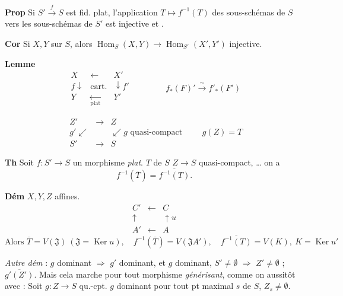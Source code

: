 \documentclass[11pt,a4paper]{article}
\begin{document}
\textbf{Prop} Si $S' \xrightarrow{f} S$ est fid. plat, l'application $T \mapsto f^{-1}(T)$ des sous-schémas de $S$ vers les sous-schémas de $S'$ est injective et \ill{}.

\textbf{Cor} Si $X, Y$ sur $S$, alors $\operatorname{Hom}_S(X, Y) \to \operatorname{Hom}_{S'}(X', Y')$ injective.

\textbf{Lemme}
\[
\begin{array}{ccc}
X & \longleftarrow & X' \\
{\scriptstyle f}\downarrow & \text{cart.} & \downarrow{\scriptstyle f'} \\
Y & \xleftarrow[\text{plat}]{} & Y'
\end{array}
\qquad\qquad f_*(F)' \xrightarrow{\ \sim\ } f'_*(F')
\]

\[
\begin{array}{ccc}
Z' & \longrightarrow & Z \\
{\scriptstyle g'}\swarrow & & \swarrow{\scriptstyle g} \text{ quasi-compact} \\
S' & \longrightarrow & S
\end{array}
\qquad g(Z) = T
\]

\textbf{Th} Soit $f : S' \to S$ un morphisme \emph{plat}.  \ill{}  $T$ de $S$   $Z \to S$ quasi-compact, … on a
\[
f^{-1}(\overline{T}) = \overline{f^{-1}(T)} .
\]

\textbf{Dém}  $X, Y, Z$ affines.
\[
\begin{array}{ccc} C' & \longleftarrow & C \\ \uparrow & & \uparrow{\scriptstyle u} \\ A' & \longleftarrow & A \end{array}
\]
\[
\text{Alors } \overline{T} = V(\mathfrak{J}) \ (\mathfrak{J} = \operatorname{Ker} u), \quad f^{-1}(\overline{T}) = V(\mathfrak{J}A'), \quad \overline{f^{-1}(T)} = V(K), \ K = \operatorname{Ker} u'
\]

\emph{Autre dém}  \ill{} :  $g$ dominant $\Rightarrow$ $g'$ dominant, et $g$ dominant, $S' \neq \emptyset$ $\Rightarrow$ $Z' \neq \emptyset$ ; $\overline{g'(Z')}$. Mais cela marche pour tout morphisme \emph{générisant}, comme on  aussitôt avec  : Soit $g : Z \to S$ qu.-cpt.  $g$ dominant  pour tout pt maximal $s$ de $S$, $Z_s \neq \emptyset$.
\end{document}
